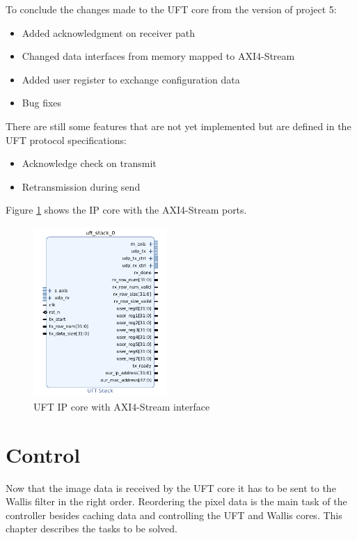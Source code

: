 To conclude the changes made to the UFT core from the version of project 5:
\begin{itemize}
  \item Added acknowledgment on receiver path
  \item Changed data interfaces from memory mapped to AXI4-Stream
  \item Added user register to exchange configuration data
  \item Bug fixes
\end{itemize}

There are still some features that are not yet implemented but are defined in
the UFT protocol specifications:
\begin{itemize}
  \item Acknowledge check on transmit
  \item Retransmission during send
\end{itemize}

Figure \ref{fig:uftipcoreaxistream} shows the IP core with the AXI4-Stream
ports.

\begin{figure}[h!]
    \centering
    \includegraphics[width=0.45\textwidth] {images/dataflow/uftcorestream.png}
    \caption{UFT IP core with AXI4-Stream interface}
    \label{fig:uftipcoreaxistream}
\end{figure}
\section{Control} \label{ch:control}
Now that the image data is received by the UFT core it has to be sent to the
Wallis filter in the right order. Reordering the pixel data is the main task of
the controller besides caching data and controlling the UFT and Wallis cores.
This chapter describes the tasks to be solved.

